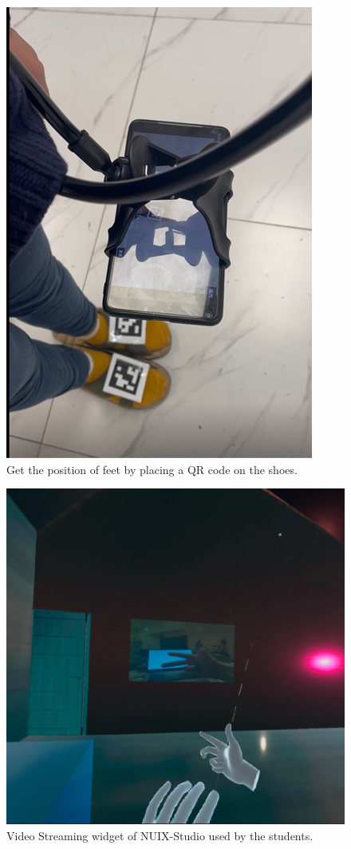 \begin{figure}
  \centering
  \includegraphics[width=0.6\linewidth]{figures/Project_11_1.png}
  \caption{Get the position of feet by placing a QR code on the shoes.}
  \label{fig:Project11_1-figure}
\end{figure}


\begin{figure}
  \centering
  \includegraphics[width=0.9\linewidth]{figures/VideoStreamingWidget.png}
  \caption{Video Streaming widget of NUIX-Studio used by the students.}
  \label{fig:VideoStreamingWidget-figure}
\end{figure}


